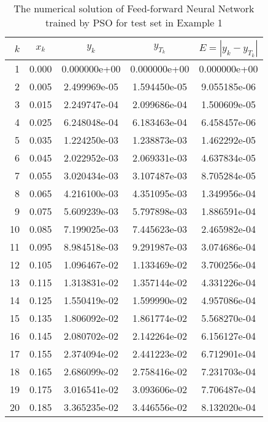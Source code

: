\begin{table}[ht]
  \caption{The numerical solution of Feed-forward Neural Network trained by PSO for test set in Example 1}
  \centering
  \begin{tabular}{rcccc}
    $k$ & $x_{k}$ & $y_{k}$ & $y_{T_{k}}$ & $E=|y_{k} - y_{T_{k}}|$\\
    \hline\hline
     1 &  0.000 &    0.000000e+00 &    0.000000e+00  &     0.000000e+00\\ 
     2 &  0.005 &    2.499969e-05 &    1.594450e-05  &     9.055185e-06\\ 
     3 &  0.015 &    2.249747e-04 &    2.099686e-04  &     1.500609e-05\\ 
     4 &  0.025 &    6.248048e-04 &    6.183463e-04  &     6.458457e-06\\ 
     5 &  0.035 &    1.224250e-03 &    1.238873e-03  &     1.462292e-05\\ 
     6 &  0.045 &    2.022952e-03 &    2.069331e-03  &     4.637834e-05\\ 
     7 &  0.055 &    3.020434e-03 &    3.107487e-03  &     8.705284e-05\\ 
     8 &  0.065 &    4.216100e-03 &    4.351095e-03  &     1.349956e-04\\ 
     9 &  0.075 &    5.609239e-03 &    5.797898e-03  &     1.886591e-04\\ 
    10 &  0.085 &    7.199025e-03 &    7.445623e-03  &     2.465982e-04\\ 
    11 &  0.095 &    8.984518e-03 &    9.291987e-03  &     3.074686e-04\\ 
    12 &  0.105 &    1.096467e-02 &    1.133469e-02  &     3.700256e-04\\ 
    13 &  0.115 &    1.313831e-02 &    1.357144e-02  &     4.331226e-04\\ 
    14 &  0.125 &    1.550419e-02 &    1.599990e-02  &     4.957086e-04\\ 
    15 &  0.135 &    1.806092e-02 &    1.861774e-02  &     5.568270e-04\\ 
    16 &  0.145 &    2.080702e-02 &    2.142264e-02  &     6.156127e-04\\ 
    17 &  0.155 &    2.374094e-02 &    2.441223e-02  &     6.712901e-04\\ 
    18 &  0.165 &    2.686099e-02 &    2.758416e-02  &     7.231703e-04\\ 
    19 &  0.175 &    3.016541e-02 &    3.093606e-02  &     7.706487e-04\\ 
    20 &  0.185 &    3.365235e-02 &    3.446556e-02  &     8.132020e-04\\ 

\end{tabular}
\end{table}
